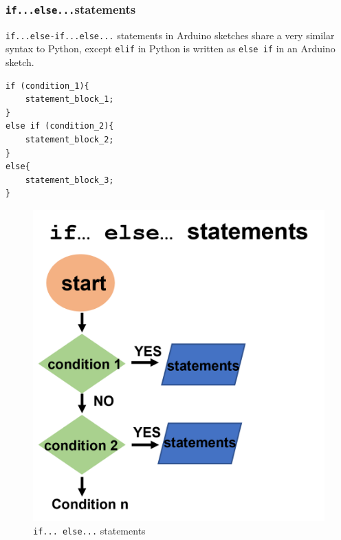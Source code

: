 \documentclass{article}
\begin{document}
\subsubsection{\texttt{if...else...}statements}
\begin{minipage}{.6\textwidth}
\texttt{if...else-if...else...} statements in Arduino sketches share a very similar syntax to Python, except \texttt{elif} in Python is written as \texttt{else if} in an Arduino sketch. \vspace{.2cm}
\begin{lstlisting}[caption=if else statements]
if (condition_1){
    statement_block_1;
}
else if (condition_2){
    statement_block_2;
}
else{
    statement_block_3;
}
\end{lstlisting}
\end{minipage}\hfill
\begin{minipage}{.35\textwidth}
\begin{figure}[H]\vspace{-1cm}
    \centering
    \includegraphics[width=.75\textwidth]{ifelse.png}
    \caption{\texttt{if... else...} statements}
\end{figure}
\end{minipage}
\end{document}
